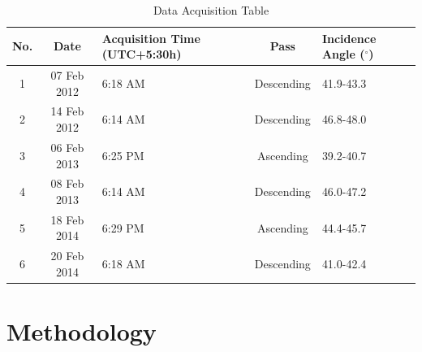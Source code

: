 \begin{table}[!h]
	\caption{Data Acquisition Table}
	\begin{center}
		\begin{tabular}{| c | c | p{3cm} | c | p{2cm} |} \hline
			No. & Date & Acquisition Time (UTC+5:30h) & Pass & Incidence Angle ($^\circ$) \\ \hline \hline
			1 & 07 Feb 2012 & 6:18 AM & Descending & 41.9-43.3\\ \hline
			2 & 14 Feb 2012 & 6:14 AM & Descending & 46.8-48.0\\ \hline
			3 & 06 Feb 2013 & 6:25 PM & Ascending & 39.2-40.7\\ \hline
			4 & 08 Feb 2013 & 6:14 AM & Descending & 46.0-47.2\\ \hline
			5 & 18 Feb 2014 & 6:29 PM & Ascending & 44.4-45.7\\ \hline
			6 & 20 Feb 2014 & 6:18 AM & Descending & 41.0-42.4\\ \hline
		\end{tabular}
	\end{center}
	\label{table:data acquisition}
\end{table}

\section{Methodology}

